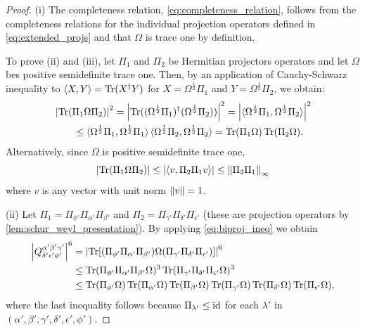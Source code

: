 \documentclass[notitlepage, 10pt]{article}
\begin{document}
\begin{proof}
    (i) The completeness relation, \cref{eq:completeness_relation}, follows from the completeness relations for the individual projection operators defined in \cref{eq:extended_projs} and that $\Omega$ is trace one by definition. 

    To prove (ii) and (iii), let $\Pi_1$ and $\Pi_2$ be Hermitian projectors operators and let $\Omega$ bes positive semidefinite trace one.
    Then, by an application of Cauchy-Schwarz inequality to $\braket{X,Y} = \operatorname{Tr}(X^{\dagger} Y)$ for $X = \Omega^{\frac{1}{2}}\Pi_1$ and $Y = \Omega^{\frac{1}{2}}\Pi_2$, we obtain:
    \begin{align}
        \label{eq:biproj_ineq}
        \begin{split}
            &\left|\operatorname{Tr}(\Pi_1 \Omega \Pi_2)\right|^2 
            = \left|\operatorname{Tr}((\Omega^{\frac{1}{2}}\Pi_1)^{\dagger}(\Omega^{\frac{1}{2}}\Pi_2))\right|^2
            = \left|\braket{\Omega^{\frac{1}{2}}\Pi_1, \Omega^{\frac{1}{2}}\Pi_2}\right|^{2}\\
            &\qquad\leq \braket{\Omega^{\frac{1}{2}}\Pi_1, \Omega^{\frac{1}{2}}\Pi_1}\braket{\Omega^{\frac{1}{2}}\Pi_2, \Omega^{\frac{1}{2}}\Pi_2}
            = \operatorname{Tr}(\Pi_1 \Omega)\operatorname{Tr}(\Pi_2 \Omega).
        \end{split}
    \end{align}
    Alternatively, since $\Omega$ is positive semidefinite trace one, 
    \begin{equation}
        \label{eq:density_double_proj}
        \left|\operatorname{Tr}(\Pi_1 \Omega \Pi_2)\right| \leq \left|\braket{v, \Pi_2\Pi_1 v}\right| \leq \left\lVert\Pi_2\Pi_1\right\rVert_{\infty}
    \end{equation}
    where $v$ is any vector with unit norm $\left\lVert v\right\rVert=1$.

    (ii) Let $\Pi_1 = \Pi_{\phi'}\Pi_{\alpha'}\Pi_{\beta'}$ and $\Pi_2 = \Pi_{\gamma'} \Pi_{\delta'} \Pi_{\epsilon'}$ (these are projection operators by \cref{lem:schur_weyl_presentation}).
    By applying \cref{eq:biproj_ineq} we obtain
    \begin{align}
        \begin{split}
            \left|Q^{\alpha'\beta'\gamma'}_{\delta'\epsilon'\phi'}\right|^{6} 
            &=\left|\operatorname{Tr}[(\Pi_{\phi'}\Pi_{\alpha'}\Pi_{\beta'}) \Omega (\Pi_{\gamma'} \Pi_{\delta'} \Pi_{\epsilon'})]\right|^6\\
            &\leq 
            \operatorname{Tr}(\Pi_{\phi'}\Pi_{\alpha'}\Pi_{\beta'} \Omega)^3
            \operatorname{Tr}(\Pi_{\gamma'}\Pi_{\delta'}\Pi_{\epsilon'} \Omega)^3\\
            &\leq 
            \operatorname{Tr}(\Pi_{\phi'}\Omega)\operatorname{Tr}(\Pi_{\alpha'}\Omega)\operatorname{Tr}(\Pi_{\beta'} \Omega)
            \operatorname{Tr}(\Pi_{\gamma'}\Omega)\operatorname{Tr}(\Pi_{\delta'}\Omega)\operatorname{Tr}(\Pi_{\epsilon'} \Omega),
        \end{split}
    \end{align}
    where the last inequality follows because $\Pi_{\lambda'} \leq \operatorname{id}$ for each $\lambda'$ in $(\alpha',\beta',\gamma',\delta',\epsilon',\phi')$.


\end{proof}
\end{document}

